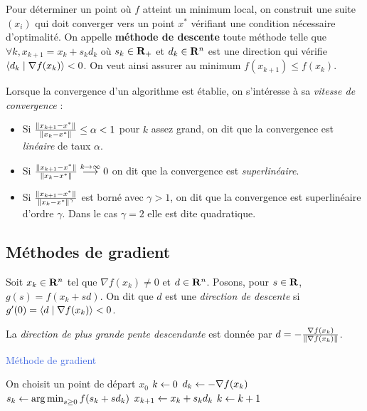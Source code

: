 	Pour déterminer un point où $f$ atteint un minimum local, on construit une suite $(x_i)$ qui doit converger vers un point $x^*$ vérifiant une condition nécessaire d'optimalité.
	On appelle \textbf{méthode de descente} toute méthode telle que $\forall k, x_{k + 1} = x_k + s_k d_k$ où $s_k \in \mathbf{R}_+$ et $d_k \in \mathbf{R}^n$ est une direction qui vérifie $\left\langle d_k \mid \nabla f(x_k) \right\rangle < 0$.
	On veut ainsi assurer au minimum $f(x_{k + 1}) \leq f(x_k)$.

	Lorsque la convergence d'un algorithme est établie, on s'intéresse à sa \emph{vitesse de convergence} :
	\begin{itemize}
		\item[\textbullet] Si $\frac{\left\lVert x_{k + 1} - x^*\right\rVert}{\left\lVert x_k - x^*\right\rVert} \leq \alpha < 1$ pour $k$ assez grand, on dit que la convergence est \emph{linéaire} de taux $\alpha$.
		\item[\textbullet] Si $\frac{\left\lVert x_{k + 1} - x^*\right\rVert}{\left\lVert x_k - x^*\right\rVert} \overset{k \to \infty}{\longrightarrow} 0$ on dit que la convergence est \emph{superlinéaire}.
		\item[\textbullet] Si $\frac{\left\lVert x_{k + 1} - x^*\right\rVert}{\left\lVert x_k - x^*\right\rVert^\gamma}$ est borné avec $\gamma > 1$, on dit que la convergence est superlinéaire d'ordre $\gamma$. Dans le cas $\gamma = 2$ elle est dite quadratique.
	\end{itemize}


\subsection{Méthodes de gradient}

	Soit $x_k \in \mathbf{R}^n$ tel que $\nabla f(x_k) \neq 0$ et $d \in \mathbf{R}^n$.
	Posons, pour $s \in \mathbf{R}$, $g(s) = f(x_k + sd)$.
	On dit que $d$ est une \emph{direction de descente} si $g'(0) = \left\langle d \mid \nabla f(x_k) \right\rangle < 0$.

	La \emph{direction de plus grande pente descendante} est donnée par $d = - \frac{\nabla f(x_k)}{\left\lVert\nabla f(x_k)\right\rVert}$.

	\begin{algorithm}[h]
		\caption{\textcolor{RoyalBlue}{Méthode de gradient}}
		On choisit un point de départ $x_0$ \;
		$k \leftarrow 0$ \;
		{
			$d_k \leftarrow - \nabla f(x_k)$ \;
			$s_k \leftarrow \operatorname{arg\, min}_{s \geq 0} f(s_k + s d_k)$ \;
			$x_{k + 1} \leftarrow x_k + s_k d_k$ \;
			$k \leftarrow k + 1$ \;
		}
	\end{algorithm}


